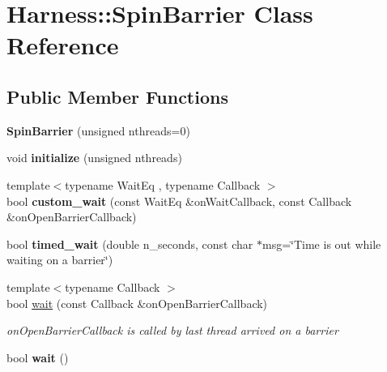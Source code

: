 \hypertarget{classHarness_1_1SpinBarrier}{}\section{Harness\+:\+:Spin\+Barrier Class Reference}
\label{classHarness_1_1SpinBarrier}
\subsection*{Public Member Functions}
\begin{DoxyCompactItemize}
\item 
\hypertarget{classHarness_1_1SpinBarrier_a98a1a7c3ec679f35e5f36ac8ca0ce6cf}{}{\bfseries Spin\+Barrier} (unsigned nthreads=0)\label{classHarness_1_1SpinBarrier_a98a1a7c3ec679f35e5f36ac8ca0ce6cf}

\item 
\hypertarget{classHarness_1_1SpinBarrier_a6de60821931c62c0c02670f090c25e29}{}void {\bfseries initialize} (unsigned nthreads)\label{classHarness_1_1SpinBarrier_a6de60821931c62c0c02670f090c25e29}

\item 
\hypertarget{classHarness_1_1SpinBarrier_ab3da5fe87e4dec7287a09a3ec3940a57}{}{\footnotesize template$<$typename Wait\+Eq , typename Callback $>$ }\\bool {\bfseries custom\+\_\+wait} (const Wait\+Eq \&on\+Wait\+Callback, const Callback \&on\+Open\+Barrier\+Callback)\label{classHarness_1_1SpinBarrier_ab3da5fe87e4dec7287a09a3ec3940a57}

\item 
\hypertarget{classHarness_1_1SpinBarrier_af2db7bc311f2249da4d493541952f2e1}{}bool {\bfseries timed\+\_\+wait} (double n\+\_\+seconds, const char $\ast$msg=\char`\"{}Time is out while waiting on a barrier\char`\"{})\label{classHarness_1_1SpinBarrier_af2db7bc311f2249da4d493541952f2e1}

\item 
\hypertarget{classHarness_1_1SpinBarrier_af528a17cba96eb8d4bfa01b1a10c2002}{}{\footnotesize template$<$typename Callback $>$ }\\bool \hyperlink{classHarness_1_1SpinBarrier_af528a17cba96eb8d4bfa01b1a10c2002}{wait} (const Callback \&on\+Open\+Barrier\+Callback)\label{classHarness_1_1SpinBarrier_af528a17cba96eb8d4bfa01b1a10c2002}

\begin{DoxyCompactList}\small\item\em on\+Open\+Barrier\+Callback is called by last thread arrived on a barrier \end{DoxyCompactList}\item 
\hypertarget{classHarness_1_1SpinBarrier_aab07028767930586d4f452eb942539ed}{}bool {\bfseries wait} ()\label{classHarness_1_1SpinBarrier_aab07028767930586d4f452eb942539ed}


\end{DoxyCompactItemize}
